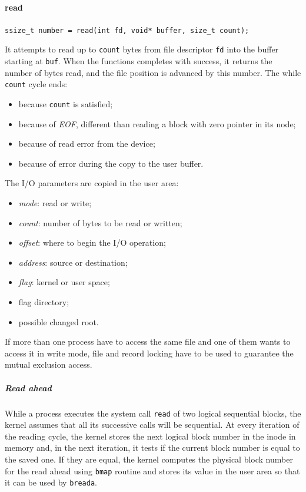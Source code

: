 \documentclass{report}
\begin{document}
\paragraph{read} \texttt{ssize\_t number = read(int fd, void* buffer, size\_t count);}

It attempts to read up to \texttt{count} bytes from file descriptor \texttt{fd} into the buffer starting at \texttt{buf}. When the functions completes with success, it returns the number of bytes read, and the file position is advanced by this number. The while \texttt{count} cycle ends:
\begin{itemize}
\item because \texttt{count} is satisfied;
\item because of \emph{EOF}, different than reading a block with zero pointer in its node;
\item because of read error from the device;
\item because of error during the copy to the user buffer.
\end{itemize}
The I/O parameters are copied in the user area:
\begin{itemize}
\item \emph{mode}: read or write;
\item \emph{count}: number of bytes to be read or written;
\item \emph{offset}: where to begin the I/O operation;
\item \emph{address}: source or destination;
\item \emph{flag}: kernel or user space;
\item flag directory;
\item possible changed root.
\end{itemize}
If more than one process have to access the same file and one of them wants to access it in write mode, file and record locking have to be used to guarantee the mutual exclusion access.

\subparagraph{Read ahead}
While a process executes the system call \texttt{read} of two logical sequential blocks, the kernel assumes that all its successive calls will be sequential. At every iteration of the reading cycle, the kernel stores the next logical block number in the inode in memory and, in the next iteration, it tests if the current block number is equal to the saved one. If they are equal, the kernel computes the physical block number for the read ahead using \texttt{bmap} routine and stores its value in the user area so that it can be used by \texttt{breada}.
\end{document}
